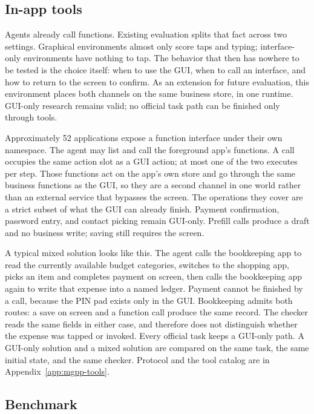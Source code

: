 \subsection{In-app tools}
\label{sec:mgpp-tools}

Agents already call functions. Existing evaluation splits that fact across two settings. Graphical environments almost only score taps and typing; interface-only environments have nothing to tap. The behavior that then has nowhere to be tested is the choice itself: when to use the GUI, when to call an interface, and how to return to the screen to confirm. As an extension for future evaluation, this environment places both channels on the same business store, in one runtime. GUI-only research remains valid; no official task path can be finished only through tools.

Approximately 52 applications expose a function interface under their own namespace. The agent may list and call the foreground app's functions. A call occupies the same action slot as a GUI action; at most one of the two executes per step. Those functions act on the app's own store and go through the same business functions as the GUI, so they are a second channel in one world rather than an external service that bypasses the screen. The operations they cover are a strict subset of what the GUI can already finish. Payment confirmation, password entry, and contact picking remain GUI-only. Prefill calls produce a draft and no business write; saving still requires the screen.

A typical mixed solution looks like this. The agent calls the bookkeeping app to read the currently available budget categories, switches to the shopping app, picks an item and completes payment on screen, then calls the bookkeeping app again to write that expense into a named ledger. Payment cannot be finished by a call, because the PIN pad exists only in the GUI. Bookkeeping admits both routes: a save on screen and a function call produce the same record. The checker reads the same fields in either case, and therefore does not distinguish whether the expense was tapped or invoked. Every official task keeps a GUI-only path. A GUI-only solution and a mixed solution are compared on the same task, the same initial state, and the same checker. Protocol and the tool catalog are in Appendix~\ref{app:mgpp-tools}.

\subsection{Benchmark}
\label{sec:mgpp-bench}

